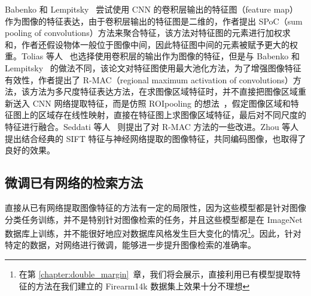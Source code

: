 Babenko 和 Lempitsky~\cite{Babenko2015AggregatingLD} 尝试使用 CNN 的卷积层输出的特征图（feature map）作为图像的特征表达，由于卷积层输出的特征图是二维的，作者提出 SPoC（sum pooling of convolutions）方法来聚合特征，该方法对特征图的元素进行加权求和，作者还假设物体一般位于图像中间，因此特征图中间的元素被赋予更大的权重。Tolias 等人~\cite{Tolias2015ParticularOR} 也选择使用卷积层的输出作为图像的特征，但是与 Babenko 和 Lempitsky~\cite{Babenko2015AggregatingLD} 的做法不同，该论文对特征图使用最大池化方法，为了增强图像特征有效性，作者提出了 R-MAC（regional maximum activation of convolutions）方法，该方法为多尺度特征表达方法，在求图像区域特征时，并不直接把图像区域重新送入 CNN 网络提取特征，而是仿照 ROIpooling 的想法~\cite{Ren2017FasterRT}，假定图像区域和特征图上的区域存在线性映射，直接在特征图上求图像区域特征，最后对不同尺度的特征进行融合。Seddati 等人~\cite{Seddati2017TowardsGP} 则提出了对 R-MAC 方法的一些改进。Zhou 等人~\cite{Zhou2017CollaborativeIE} 提出结合经典的 SIFT 特征与神经网络提取的图像特征，共同编码图像，也取得了良好的效果。

\subsection{微调已有网络的检索方法}

直接从已有网络提取图像特征的方法有一定的局限性，因为这些模型都是针对图像分类任务训练，并不是特别针对图像检索的任务，并且这些模型都是在 ImageNet 数据库上训练，并不能很好地应对数据库风格发生巨大变化的情况\footnote{在第 \ref{chapter:double_margin}~章，我们将会展示，直接利用已有模型提取特征的方法在我们建立的 Firearm14k 数据集上效果十分不理想}。因此，针对特定的数据，对网络进行微调，能够进一步提升图像检索的准确率。

